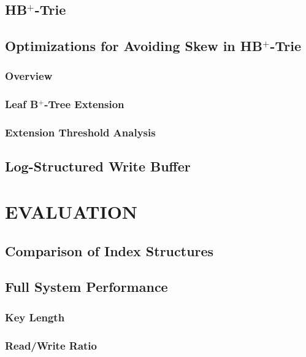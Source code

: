 \documentclass[lang=cn]{elegantpaper}
\begin{document}
\subsection{HB$^+$-Trie}

\subsection{Optimizations for Avoiding Skew in HB$^+$-Trie}

\subsubsection{Overview}

\subsubsection{Leaf B$^+$-Tree Extension}

\subsubsection{Extension Threshold Analysis}

\subsection{Log-Structured Write Buffer}

\newpage

\section{EVALUATION}

\subsection{Comparison of Index Structures}

\subsection{Full System Performance}

\subsubsection{Key Length}

\subsubsection{Read/Write Ratio}
\end{document}
